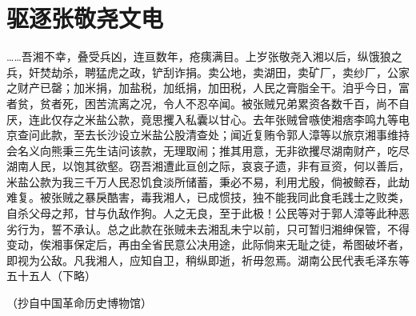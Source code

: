\section{驱逐张敬尧文电}



……吾湘不幸，叠受兵凶，连亘数年，疮痍满目。上岁张敬尧入湘以后，纵饿狼之兵，奸焚劫杀，聘猛虎之政，铲刮诈捐。卖公地，卖湖田，卖矿厂，卖纱厂，公家之财产已罄；加米捐，加盐税，加纸捐，加田税，人民之膏脂全干。洎乎今日，富者贫，贫者死，困苦流离之况，令人不忍卒闻。被张贼兄弟累资各数千百，尚不自厌，连此仅存之米盐公款，竟思攫入私囊以甘心。去年张贼曾嗾使湘痞李鸣九等电京查问此款，至去长沙设立米盐公股清查处；闻近复贿令郭人漳等以旅京湘事维持会名义向熊秉三先生诘问该款，无理取闹；推其用意，无非欲攫尽湖南财产，吃尽湖南人民，以饱其欲壑。窃吾湘遭此亘创之际，哀哀子遗，非有亘资，何以善后，米盐公款为我三千万人民忍饥食淡所储蓄，秉必不易，利用尤殷，倘被鲸吞，此劫难复。被张贼之暴戾酷害，毒我湘人，已成惯技，独不能我同此食毛践士之败类，自杀父母之邦，甘与仇敌作狗。人之无良，至于此极！公民等对于郭人漳等此种恶劣行为，誓不承认。总之此款在张贼未去湘乱未宁以前，只可暂归湘绅保管，不得变动，俟湘事保定后，再由全省民意公决用途，此际倘来无耻之徒，希图破坏者，即视为公敌。凡我湘人，应知自卫，稍纵即逝，祈毋忽焉。湖南公民代表毛泽东等五十五人（下略）

\begin{flushright}（抄自中国革命历史博物馆）\end{flushright}

